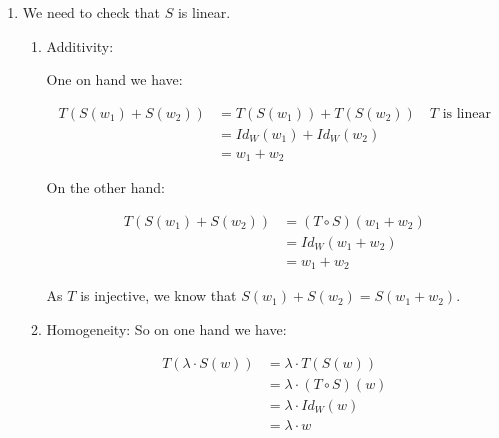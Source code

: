 {{{\begin{enumerate}[label=(\roman*)]
				      \begin{align*}
					      T(S(T(v))) & = (T \circ (S \circ T))(v) \quad\text{\(T\)  injective} \\
					                 & = ((T \circ S) \circ T)(v) \quad \implies S(T(v)) = v   \\
					                 & = (T \circ S)(T(v))                                     \\
					                 & = Id_{W}(T(v))                                          \\
					                 & = T(v)
				      \end{align*}
				\item We need to check that \(S\) is linear.

				      \begin{enumerate}[label=(\alph*)]
					      \item Additivity:

					            One on hand we have:

					            \begin{align*}
						            T(S(w_1) + S(w_2)) & = T(S(w_1)) + T(S(w_2)) \quad\text{\(T\) is linear} \\
						                               & = Id_{W}(w_1) + Id_{W}(w_2)                         \\
						                               & = w_1 + w_2
					            \end{align*}

					            On the other hand:

					            \begin{align*}
						            T(S(w_1) + S(w_2)) & = (T \circ S)(w_1 + w_2) \\
						                               & = Id_{W}(w_1 + w_2)      \\
						                               & = w_1 + w_2
					            \end{align*}

					            As \(T\) is injective, we know that \(S(w_1) + S(w_2) = S(w_1 + w_2)\).

					      \item Homogeneity:
					            So on one hand we have:

					            \begin{align*}
						            T(\lambda \cdot S(w)) & = \lambda \cdot T(S(w))        \\
						                                  & = \lambda \cdot (T \circ S)(w) \\
						                                  & = \lambda \cdot Id_{W}(w)      \\
						                                  & = \lambda \cdot w
					            \end{align*}


\end{enumerate}
\end{enumerate}}}}
